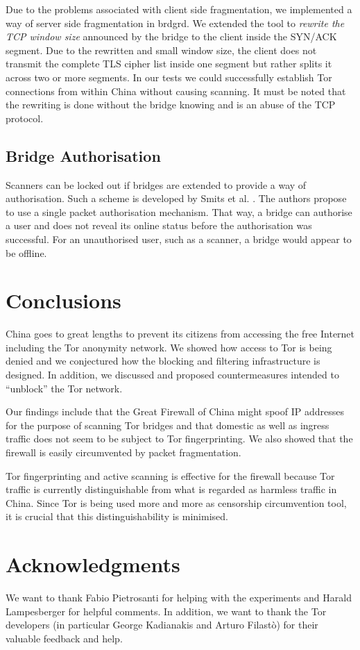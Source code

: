 \documentclass[runningheads,a4paper]{llncs}
\begin{document}
Due to the problems associated with client side fragmentation, we implemented a way of server side
fragmentation in brdgrd. We extended the tool to \emph{rewrite the TCP window size} announced by the
bridge to the client inside the SYN/ACK segment. Due to the rewritten and small window size, the
client does not transmit the complete TLS cipher list inside one segment but rather splits it across
two or more segments. In our tests we could successfully establish Tor connections from within China
without causing scanning. It must be noted that the rewriting is done without the bridge knowing and
is an abuse of the TCP protocol.

\subsection{Bridge Authorisation}
Scanners can be locked out if bridges are extended to provide a way of authorisation. Such a scheme
is developed by Smits et al. \cite{Smits2011}. The authors propose to use a single packet
authorisation mechanism. That way, a bridge can authorise a user and does not reveal its online
status before the authorisation was successful. For an unauthorised user, such as a scanner, a
bridge would appear to be offline.


\section{Conclusions}
\label{sec:conclusion}
China goes to great lengths to prevent its citizens from accessing the free Internet including the
Tor anonymity network. We showed how access to Tor is being denied and we conjectured how the
blocking and filtering infrastructure is designed. In addition, we discussed and proposed
countermeasures intended to ``unblock'' the Tor network.

Our findings include that the Great Firewall of China might spoof IP addresses for the purpose of
scanning Tor bridges and that domestic as well as ingress traffic does not seem to be subject to Tor
fingerprinting. We also showed that the firewall is easily circumvented by packet fragmentation.

Tor fingerprinting and active scanning is effective for the firewall because Tor traffic is
currently distinguishable from what is regarded as harmless traffic in China. Since Tor is being
used more and more as censorship circumvention tool, it is crucial that this distinguishability is
minimised.


\section*{Acknowledgments}
\label{sec:acks}
We want to thank Fabio Pietrosanti for helping with the experiments and Harald Lampesberger for
helpful comments. In addition, we want to thank the Tor developers (in particular George Kadianakis
and Arturo Filast\`{o}) for their valuable feedback and help.
\end{document}
